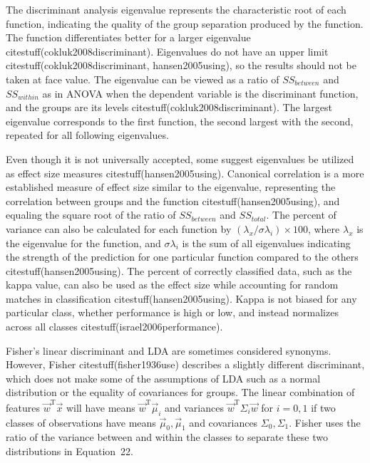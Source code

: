 \documentclass[preprint,12pt]{elsarticle}
\begin{document}
The discriminant analysis eigenvalue represents the characteristic root of each function, indicating the quality of the group separation produced by the function. The function differentiates better for a larger eigenvalue citestuff(cokluk2008discriminant). Eigenvalues do not have an upper limit citestuff(cokluk2008discriminant, hansen2005using), so the results should not be taken at face value. The eigenvalue can be viewed as a ratio of $SS_{between}$ and $SS_{within}$ as in ANOVA when the dependent variable is the discriminant function, and the groups are its levels citestuff(cokluk2008discriminant). The largest eigenvalue corresponds to the first function, the second largest with the second, repeated for all following eigenvalues.

Even though it is not universally accepted, some suggest eigenvalues be utilized as effect size measures citestuff(hansen2005using). Canonical correlation is a more established measure of effect size similar to the eigenvalue, representing the correlation between groups and the function citestuff(hansen2005using), and equaling the square root of the ratio of $SS_{between}$ and $SS_{total}$. The percent of variance can also be calculated for each function by $(\lambda_{x}/\sigma\lambda_{i}) \times 100$, where $\lambda_{x}$ is the eigenvalue for the function, and $\sigma\lambda_{i}$ is the sum of all eigenvalues indicating the strength of the prediction for one particular function compared to the others citestuff(hansen2005using). The percent of correctly classified data, such as the kappa value, can also be used as the effect size while accounting for random matches in classification citestuff(hansen2005using). Kappa is not biased for any particular class, whether performance is high or low, and instead normalizes across all classes citestuff(israel2006performance). 

Fisher's linear discriminant and LDA are sometimes considered synonyms. However, Fisher citestuff(fisher1936use) describes a slightly different discriminant, which does not make some of the assumptions of LDA such as a normal distribution or the equality of covariances for groups. The linear combination of features ${\vec{w}}^{\mathrm{T}}{\vec{x}}$ will have means ${\vec{w}}^{\mathrm{T}}{\vec{\mu}}_{i}$ and variances ${\vec{w}}^{\mathrm{T}}\Sigma_{i}{\vec{w}}$ for $i=0,1$ if two classes of observations have means ${\vec{\mu}}_{0},{\vec{\mu}}_{1}$ and covariances $\Sigma_{0},\Sigma_{1}$. Fisher uses the ratio of the variance between and within the classes to separate these two distributions in Equation~22.
\end{document}
